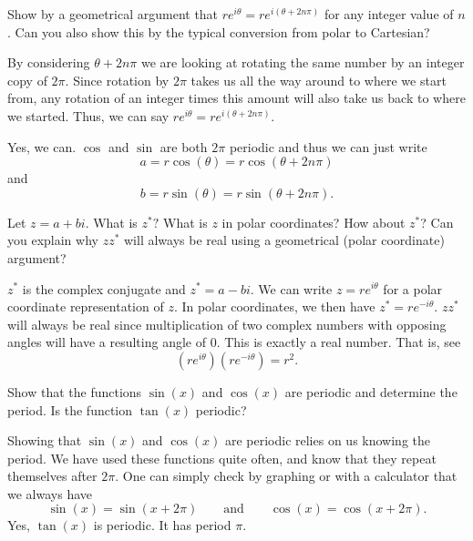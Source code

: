 \documentclass[12pt]{article} %
\begin{document}
\newpage

\begin{problem}
Show by a geometrical argument that $re^{i\theta}=re^{i(\theta+2n\pi)}$ for any integer value of $n$.  Can you also show this by the typical conversion from polar to Cartesian?
\end{problem}
\begin{solution}
By considering $\theta+2n\pi$ we are looking at rotating the same number by an integer copy of $2\pi$. Since rotation by $2\pi$ takes us all the way around to where we start from, any rotation of an integer times this amount will also take us back to where we started. Thus, we can say $re^{i\theta}=re^{i(\theta+2n\pi)}$. 

Yes, we can. $\cos$ and $\sin$ are both $2\pi$ periodic and thus we can just write
\[
a=r\cos(\theta)=r\cos(\theta+2n\pi)
\]
and
\[
b=r\sin(\theta)=r\sin(\theta+2n\pi).
\]
\end{solution}

\newpage

\begin{problem}
Let $z=a+bi$.  What is $z^*?$  What is $z$ in polar coordinates? How about $z^*$? Can you explain why $zz^*$ will always be real using a geometrical (polar coordinate) argument?
\end{problem}
\begin{solution}
$z^*$ is the complex conjugate and $z^*=a-bi$.  We can write $z=re^{i\theta}$ for a polar coordinate representation of $z$.  In polar coordinates, we then have $z^*=re^{-i\theta}$. $zz^*$ will always be real since multiplication of two complex numbers with opposing angles will have a resulting angle of $0$. This is exactly a real number. That is, see
\[
\left( re^{i\theta} \right) \left(re^{-i\theta}\right) = r^2.
\]
\end{solution}

\newpage

\begin{problem}
Show that the functions $\sin(x)$ and $\cos(x)$ are periodic and determine the period.  Is the function $\tan(x)$ periodic?
\end{problem}
\begin{solution}
Showing that $\sin(x)$ and $\cos(x)$ are periodic relies on us knowing the period.  We have used these functions quite often, and know that they repeat themselves after $2\pi$. One can simply check by graphing or with a calculator that we always have
\[
\sin(x)=\sin(x+2\pi) \qquad \textrm{and} \qquad \cos(x)=\cos(x+2\pi).
\]
Yes, $\tan(x)$ is periodic.  It has period $\pi$.
\end{solution}
\end{document}
